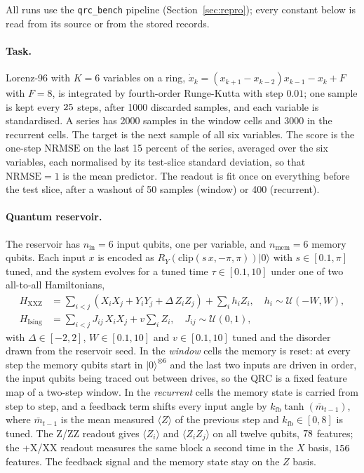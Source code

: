 \documentclass[11pt,a4paper]{article}
\newcommand{\nrmse}{\mathrm{NRMSE}}
\begin{document}
All runs use the \texttt{qrc\_bench} pipeline (Section~\ref{sec:repro}); every constant below is read
from its source or from the stored records.

\paragraph{Task.} Lorenz-96 with $K=6$ variables on a ring,
$\dot x_k = (x_{k+1}-x_{k-2})x_{k-1} - x_k + F$ with $F=8$, is integrated by fourth-order
Runge-Kutta with step $0.01$; one sample is kept every $25$ steps, after 1000 discarded
samples, and each variable is standardised. A series has 2000 samples in the window cells and 3000
in the recurrent cells. The target is the next sample of all six variables. The score is the
one-step $\nrmse$ on the last 15 percent of the series, averaged over the six variables, each
normalised by its test-slice standard deviation, so that $\nrmse=1$ is the mean predictor. The
readout is fit once on everything before the test slice, after a washout of 50 samples (window) or
400 (recurrent).

\paragraph{Quantum reservoir.} The reservoir has $n_{\mathrm{in}}=6$ input qubits, one per variable,
and $n_{\mathrm{mem}}=6$ memory qubits. Each input $x$ is encoded as
$R_Y(\mathrm{clip}(s\,x,-\pi,\pi))|0\rangle$ with $s\in[0.1,\pi]$ tuned, and the system evolves for
a tuned time $\tau\in[0.1,10]$ under one of two all-to-all Hamiltonians,
\begin{align}
H_{\mathrm{XXZ}} &= \sum_{i<j} \left(X_iX_j + Y_iY_j + \Delta\, Z_iZ_j\right) + \sum_i h_i Z_i,
  \quad h_i\sim\mathcal{U}(-W,W),\\
H_{\mathrm{Ising}} &= \sum_{i<j} J_{ij}\, X_iX_j + v\sum_i Z_i, \quad J_{ij}\sim\mathcal{U}(0,1),
\end{align}
with $\Delta\in[-2,2]$, $W\in[0.1,10]$ and $v\in[0.1,10]$ tuned and the disorder drawn from the
reservoir seed. In the \emph{window} cells the memory is reset: at every step the memory qubits
start in $|0\rangle^{\otimes 6}$ and the last two inputs are driven in order, the input qubits being
traced out between drives, so the QRC is a fixed feature map of a two-step window. In the
\emph{recurrent} cells the memory state is carried from step to step, and a feedback term shifts
every input angle by $k_{\mathrm{fb}}\tanh(\bar m_{t-1})$, where $\bar m_{t-1}$ is the mean measured
$\langle Z\rangle$ of the previous step and $k_{\mathrm{fb}}\in[0,8]$ is tuned. The Z/ZZ readout
gives $\langle Z_i\rangle$ and $\langle Z_iZ_j\rangle$ on all twelve qubits, $78$ features;
the +X/XX readout measures the same block a second time in the $X$ basis, $156$ features. The
feedback signal and the memory state stay on the $Z$ basis.
\end{document}
